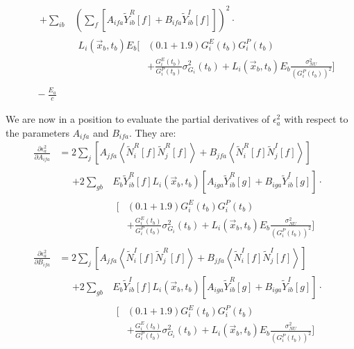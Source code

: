 \begin{align*}
&\quad \begin{aligned}
  + \sum_{ib} &\left( \sum_f \left[A_{ifa} \widetilde{Y}_{ib}^R[f] + B_{ifa} \widetilde{Y}_{ib}^I[f]\right]\right)^2 \cdot \\
  & \begin{aligned}
    L_i(\vec{x}_b,t_b) E_b \bigg[ &(0.1 + 1.9) G^E_i(t_b) G^P_i(t_b) \\
    & + \frac{G^E_i(t_b)}{G^P_i(t_b)} \sigma^2_{G_i}(t_b) + L_i(\vec{x}_b,t_b) E_b \frac{\sigma^2_{NU}}{\left(G^P_i(t_b)\right)^2} \bigg]
\end{aligned} \end{aligned} \\
&\quad - \frac{E_a}{c}
\end{align*}

We are now in a position to evaluate the partial derivatives of $\epsilon^2_a$ with respect to the parameters $A_{ifa}$ and $B_{ifa}$.  They are:
\begin{align*}
\frac{\partial \epsilon^2_a}{\partial A_{ifa}} &= 2 \sum_j \left[ A_{jfa} \left<\widetilde{N}_i^R[f]\widetilde{N}_j^R[f]\right> + B_{jfa} \left<\widetilde{N}_i^R[f]\widetilde{N}_j^I[f]\right>\right] \\
&\quad \begin{aligned}
  + 2 \sum_{gb} & E_b\widetilde{Y}_{ib}^R[f] L_i(\vec{x}_b,t_b)\left[A_{iga} \widetilde{Y}_{ib}^R[g] + B_{iga} \widetilde{Y}_{ib}^I[g]\right] \cdot \\
  & \begin{aligned}
    \bigg[ &(0.1 + 1.9) G^E_i(t_b) G^P_i(t_b) \\
  & + \frac{G^E_i(t_b)}{G^P_i(t_b)} \sigma^2_{G_i}(t_b) + L_i(\vec{x}_b,t_b) E_b \frac{\sigma^2_{NU}}{\left(G^P_i(t_b)\right)^2} \bigg]
\end{aligned} \end{aligned}\\
%
\frac{\partial \epsilon^2_a}{\partial B_{ifa}} &= 2 \sum_j \left[ A_{jfa} \left<\widetilde{N}_i^I[f]\widetilde{N}_j^R[f]\right> + B_{jfa} \left<\widetilde{N}_i^I[f]\widetilde{N}_j^I[f]\right>\right] \\
&\quad \begin{aligned}
  + 2 \sum_{gb} & E_b\widetilde{Y}_{ib}^I[f] L_i(\vec{x}_b,t_b)\left[A_{iga} \widetilde{Y}_{ib}^R[g] + B_{iga} \widetilde{Y}_{ib}^I[g]\right] \cdot \\
  & \begin{aligned}
    \bigg[ &(0.1 + 1.9) G^E_i(t_b) G^P_i(t_b) \\
  & + \frac{G^E_i(t_b)}{G^P_i(t_b)} \sigma^2_{G_i}(t_b) + L_i(\vec{x}_b,t_b) E_b \frac{\sigma^2_{NU}}{\left(G^P_i(t_b)\right)^2} \bigg]
\end{aligned} \end{aligned}
\end{align*}

